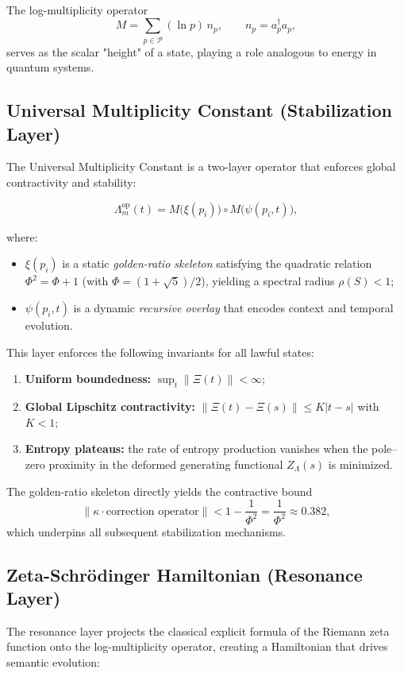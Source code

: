 \documentclass[12pt]{article}
\theoremstyle{plain}
\theoremstyle{definition}
\theoremstyle{remark}
\begin{document}
The log-multiplicity operator
\[
M = \sum_{p \in \mathcal{P}} (\ln p)\, n_p, \qquad n_p = a_p^\dagger a_p,
\]
serves as the scalar "height" of a state, playing a role analogous to energy in quantum systems.

\subsection{Universal Multiplicity Constant (Stabilization Layer)}

The Universal Multiplicity Constant is a two-layer operator that enforces global contractivity and stability:

\[
\Lambda_m^{\text{op}}(t) = M\bigl(\xi(p_i)\bigr) \circ M\bigl(\psi(p_i, t)\bigr),
\]

where:
\begin{itemize}
    \item $\xi(p_i)$ is a static \emph{golden-ratio skeleton} satisfying the quadratic relation $\Phi^2 = \Phi + 1$ (with $\Phi = (1+\sqrt{5})/2$), yielding a spectral radius $\rho(S) < 1$;
    \item $\psi(p_i, t)$ is a dynamic \emph{recursive overlay} that encodes context and temporal evolution.
\end{itemize}

This layer enforces the following invariants for all lawful states:
\begin{enumerate}
    \item \textbf{Uniform boundedness:} $\displaystyle \sup_{t} \|\Xi(t)\| < \infty$;
    \item \textbf{Global Lipschitz contractivity:} $\|\Xi(t) - \Xi(s)\| \leq K |t-s|$ with $K < 1$;
    \item \textbf{Entropy plateaus:} the rate of entropy production vanishes when the pole–zero proximity in the deformed generating functional $Z_\Lambda(s)$ is minimized.
\end{enumerate}

The golden-ratio skeleton directly yields the contractive bound
\[
\|\kappa \cdot \text{correction operator}\| < 1 - \frac{1}{\Phi^2} = \frac{1}{\Phi^2} \approx 0.382,
\]
which underpins all subsequent stabilization mechanisms.

\subsection{Zeta-Schrödinger Hamiltonian (Resonance Layer)}

The resonance layer projects the classical explicit formula of the Riemann zeta function onto the log-multiplicity operator, creating a Hamiltonian that drives semantic evolution:
\end{document}
